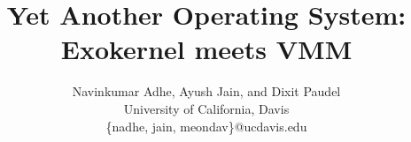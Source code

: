 \documentclass[letterpaper,twocolumn,10pt]{article}
\date{}
\begin{document}
\title{Yet Another Operating System: Exokernel meets VMM}
\author{Navinkumar Adhe, Ayush Jain, and Dixit Paudel\\
University of California, Davis\\
\{nadhe, jain, meondav\}@ucdavis.edu}
\maketitle







\end{document}
